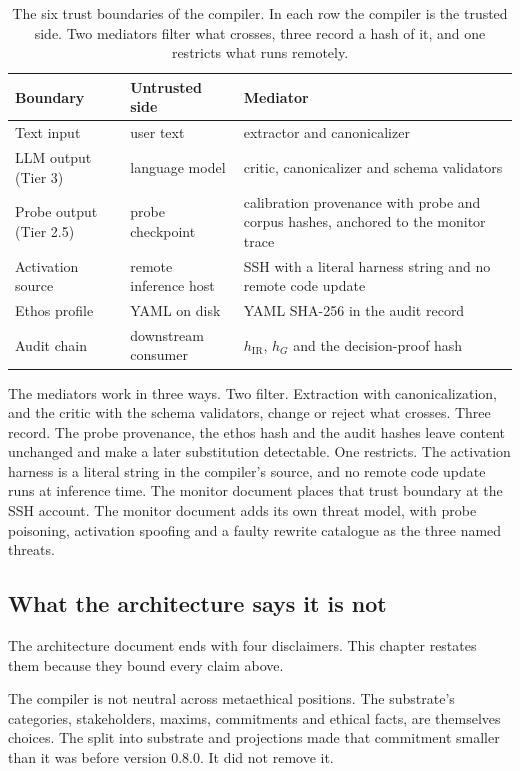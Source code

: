 \begin{table}[t]
\centering\footnotesize
\begin{tabular}{p{30mm}p{30mm}p{62mm}}
\hline
Boundary & Untrusted side & Mediator \\
\hline
Text input & user text & extractor and canonicalizer \\
LLM output (Tier 3) & language model & critic, canonicalizer and schema validators \\
Probe output (Tier 2.5) & probe checkpoint & calibration provenance with probe and corpus hashes, anchored to the monitor trace \\
Activation source & remote inference host & SSH with a literal harness string and no remote code update \\
Ethos profile & YAML on disk & YAML SHA-256 in the audit record \\
Audit chain & downstream consumer & $h_{\mathrm{IR}}$, $h_G$ and the decision-proof hash \\
\hline
\end{tabular}
\caption{The six trust boundaries of the compiler. In each row the compiler is the trusted side.
Two mediators filter what crosses, three record a hash of it, and one restricts what runs remotely.}
\label{tab:compiler-trust}
\end{table}

The mediators work in three ways. Two filter. Extraction with canonicalization, and the critic
with the schema validators, change or reject what crosses. Three record. The probe provenance,
the ethos hash and the audit hashes leave content unchanged and make a later substitution
detectable. One restricts. The activation harness is a literal string in the compiler's source, and
no remote code update runs at inference time. The monitor document places that trust boundary at
the SSH account. The monitor document adds its own threat
model, with probe poisoning, activation spoofing and a faulty rewrite catalogue as the three named
threats.

\subsection{What the architecture says it is not}

The architecture document ends with four disclaimers. This chapter restates them because they
bound every claim above.

The compiler is not neutral across metaethical positions. The substrate's categories,
stakeholders, maxims, commitments and ethical facts, are themselves choices. The split into
substrate and projections made that commitment smaller than it was before version 0.8.0. It did
not remove it.

